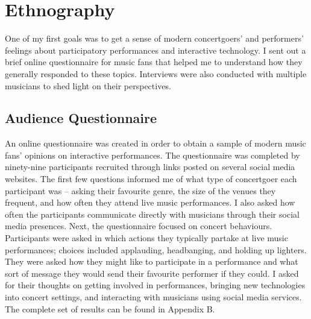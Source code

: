 \chapter{Ethnography}

One of my first goals was to get a sense of modern concertgoers' and performers' feelings about participatory performances and interactive technology. I sent out a brief online questionnaire for music fans that helped me to understand how they generally responded to these topics. Interviews were also conducted with multiple musicians to shed light on their perspectives.

\section{Audience Questionnaire}

An online questionnaire was created in order to obtain a sample of modern music fans' opinions on interactive performances. The questionnaire was completed by ninety-nine participants recruited through links posted on several social media websites. The first few questions informed me of what type of concertgoer each participant was -- asking their favourite genre, the size of the venues they frequent, and how often they attend live music performances. I also asked how often the participants communicate directly with musicians through their social media presences. Next, the questionnaire focused on concert behaviours. Participants were asked in which actions they typically partake at live music performances; choices included applauding, headbanging, and holding up lighters. They were asked how they might like to participate in a performance and what sort of message they would send their favourite performer if they could. I asked for their thoughts on getting involved in performances, bringing new technologies into concert settings, and interacting with musicians using social media services. The complete set of results can be found in Appendix B.

